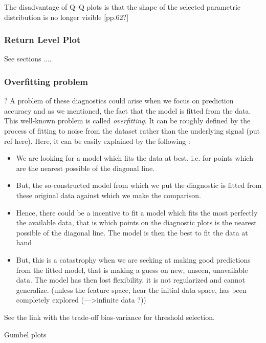 \documentclass[11pt,a4paper,openany ]{book}
\begin{document}
The disadvantage of Q–Q plots is that the shape of the selected
parametric distribution is no longer visible \cite{beirlant_statistics_2006}[pp.62?]


\subsubsection*{Return Level Plot}

See sections ....

\subsubsection*{Overfitting problem} \cite{northrop_cross_2016}?
A problem of these diagnostics could arise when we focus on prediction accuracy and as we mentioned, the fact that the model is fitted from the data. This well-known problem is called \emph{overfitting}. It can be roughly defined by the process of fitting to noise from the dataset rather than the underlying signal (put ref here). Here, it can be easily explained by the following :
\begin{itemize}
	
	\item We are looking for a model which fits the data at best, i.e. for points which are the nearest possible of the diagonal line.
	
	\item But, the so-constructed model from which we put the diagnostic is fitted from these original data against which we make the comparison.
	
	\item Hence, there could be a incentive to fit a model which fits the most perfectly the available data, that is which points on the diagnostic plots is the nearest possible of the diagonal line. The model is then the best to fit the data at hand
	
	\item But, this is a catastrophy when we are seeking at making good predictions from the fitted model, that is making a guess on new, unseen, unavailable data. The model has then lost flexibility, it is not regularized and cannot generalize. (unless the feature space, hear the initial data space, has been completely explored (--->infinite data ?))
\end{itemize}
See the link with the trade-off bias-variance for threshold selection.



Gumbel plots
\end{document}
